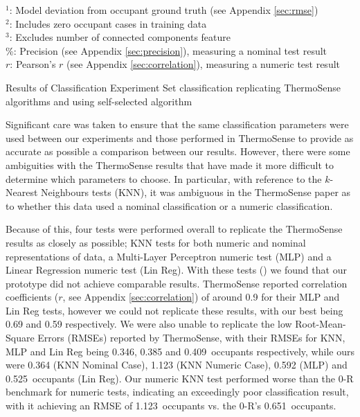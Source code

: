 \documentclass[../thesis/thesis.tex]{subfiles}
\begin{document}
\begin{table}
\parbox{300pt}{\footnotesize
$^1$: Model deviation from occupant ground truth (see Appendix \ref{sec:rmse}) \\
$^2$: Includes zero occupant cases in training data \\
$^3$: Excludes number of connected components feature \\
\%: Precision (see Appendix \ref{sec:precision}), measuring a nominal test result \\
$r$: Pearson's $r$ (see Appendix \ref{sec:correlation}), measuring a numeric test result \\
}
\caption{Results of Classification Experiment Set classification replicating ThermoSense algorithms and using self-selected algorithm}
\label{tab:results:set1}
\end{table}

Significant care was taken to ensure that the same classification parameters were used between our experiments and those performed in ThermoSense to provide as accurate as possible a comparison between our results. However, there were some ambiguities with the ThermoSense results that have made it more difficult to determine which parameters to choose. In particular, with reference to the $k$-Nearest Neighbours tests (KNN), it was ambiguous in the ThermoSense paper as to whether this data used a nominal classification or a numeric classification.

Because of this, four tests were performed overall to replicate the ThermoSense results as closely as possible; KNN tests for both numeric and nominal representations of data, a Multi-Layer Perceptron numeric test (MLP) and a Linear Regression numeric test (Lin Reg). With these tests () we found that our prototype did not achieve comparable results. ThermoSense reported correlation coefficients ($r$, see Appendix \ref{sec:correlation}) of around 0.9 for their MLP and Lin Reg tests, however we could not replicate these results, with our best being 0.69 and 0.59 respectively. We were also unable to replicate the low Root-Mean-Square Errors (RMSEs) reported by ThermoSense, with their RMSEs for KNN, MLP and Lin Reg being 0.346, 0.385 and 0.409~occupants respectively, while ours were 0.364 (KNN Nominal Case), 1.123 (KNN Numeric Case), 0.592 (MLP) and 0.525~occupants (Lin Reg). Our numeric KNN test performed worse than the 0-R benchmark for numeric tests, indicating an exceedingly poor classification result, with it achieving an RMSE of 1.123~occupants vs. the 0-R's 0.651~occupants.
\end{document}
